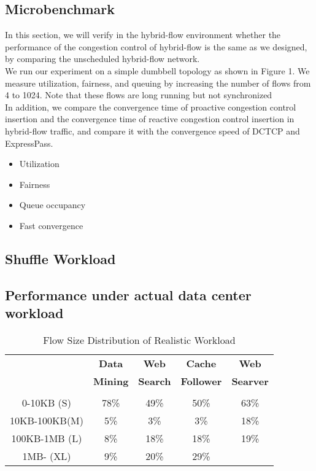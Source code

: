 \documentclass[conference]{IEEEtran}
\begin{document}
\subsection{Microbenchmark}
In this section, we will verify in the hybrid-flow environment whether the performance of the congestion control of hybrid-flow is the same as we designed, by comparing the unscheduled hybrid-flow network.\\
\indent We run our experiment on a simple dumbbell topology as shown in Figure 1. We measure utilization, fairness, and queuing by increasing the number of flows from 4 to 1024. Note that these flows are long running but not synchronized\\
In addition, we compare the convergence time of proactive congestion control insertion and the convergence time of reactive congestion control insertion in hybrid-flow traffic, and compare it with the convergence speed of DCTCP and ExpressPass.
\begin{itemize}
\item  Utilization
\item Fairness
\item Queue occupancy
\item Fast convergence
\end{itemize}
\subsection{Shuffle Workload}
\subsection{Performance under actual data center workload}
\begin{table}[!t]
\renewcommand{\arraystretch}{1.3}
\caption{Flow Size Distribution of Realistic Workload}
\label{table_example}
\centering
\begin{tabular}{c||c|c|c|c}
\hline
\bfseries  & \bfseries Data  & \bfseries Web  & \bfseries Cache  & \bfseries Web \\
\bfseries  & \bfseries Mining  & \bfseries Search  & \bfseries Follower  & \bfseries Searver \\
\bfseries  & \bfseries \cite{GREENBERG2009VL2} & \bfseries \cite{Alizadeh2010Data} & \bfseries  \cite{roy2015inside} & \bfseries \cite{roy2015inside}\\
\hline\hline
0-10KB    (S) & 78\% & 49\% & 50\% &63\%\\
\hline
10KB-100KB(M) &  5\% & 3\%  & 3\% & 18\%\\
\hline
100KB-1MB (L) & 8\% & 18\% & 18\% & 19\%\\
\hline
1MB-      (XL)& 9\% & 20\% & 29\% &   \\
\hline
\end{tabular}
\end{table}
\end{document}

